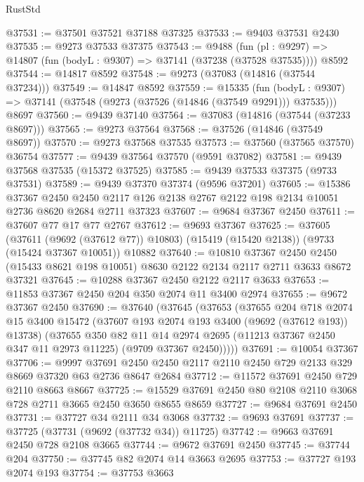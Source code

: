 \begin{lexlean}{RustStd}
\begin{coremodule}
@37531 := @37501 @37521 @37188 @37325
@37533 := @9403 @37531 @2430
@37535 := @9273 @37533 @37375
@37543 := @9488
    (fun (pl : @9297) => @14807 (fun (bodyL : @9307) => @37141 (@37238 (@37528 @37535))))
    @8592
@37544 := @14817 @8592
@37548 := @9273 (@37083 (@14816 (@37544 @37234)))
@37549 := @14847 @8592
@37559 := @15335
    (fun (bodyL : @9307) => @37141 (@37548 (@9273 (@37526 (@14846 (@37549 @9291))) @37535)))
    @8697
@37560 := @9439 @37140
@37564 := @37083 (@14816 (@37544 (@37233 @8697)))
@37565 := @9273 @37564
@37568 := @37526 (@14846 (@37549 @8697))
@37570 := @9273 @37568 @37535
@37573 := @37560 (@37565 @37570) @36754
@37577 := @9439 @37564 @37570 (@9591 @37082)
@37581 := @9439 @37568 @37535 (@15372 @37525)
@37585 := @9439 @37533 @37375 (@9733 @37531)
@37589 := @9439 @37370 @37374 (@9596 @37201)
@37605 := @15386
    @37367
    @2450
    @2450
    @2117
    @126
    @2138
    @2767
    @2122
    @198
    @2134
    @10051
    @2736
    @8620
    @2684
    @2711
    @37323
@37607 := @9684 @37367 @2450
@37611 := @37607 @77 @17 @77 @2767
@37612 := @9693 @37367
@37625 := @37605
    (@37611 (@9692 (@37612 @77)) @10803)
    (@15419 (@15420 @2138))
    (@9733 (@15424 @37367 @10051))
    @10882
@37640 := @10810
    @37367
    @2450
    @2450
    (@15433 @8621 @198 @10051)
    @8630
    @2122
    @2134
    @2117
    @2711
    @3633
    @8672
    @37321
@37645 := @10288 @37367 @2450 @2122 @2117 @3633
@37653 := @11853 @37367 @2450 @204 @350 @2074 @11 @3400 @2974
@37655 := @9672 @37367 @2450
@37690 := @37640
    (@37645
      (@37653
        (@37655
          @204
          @718
          @2074
          @15
          @3400
          @15472
          (@37607 @193 @2074 @193 @3400 (@9692 (@37612 @193)) @13738)
          (@37655
            @350
            @82
            @11
            @14
            @2974
            @2695
            (@11213 @37367 @2450 @347 @11 @2973 @11225)
            (@9709 @37367 @2450)))))
@37691 := @10054 @37367
@37706 := @9997
    @37691
    @2450
    @2450
    @2117
    @2110
    @2450
    @729
    @2133
    @329
    @8669
    @37320
    @63
    @2736
    @8647
    @2684
@37712 := @11572 @37691 @2450 @729 @2110 @8663 @8667
@37725 := @15529 @37691 @2450 @80 @2108 @2110 @3068 @728 @2711 @3665 @2450 @3650 @8655 @8659
@37727 := @9684 @37691 @2450
@37731 := @37727 @34 @2111 @34 @3068
@37732 := @9693 @37691
@37737 := @37725 (@37731 (@9692 (@37732 @34)) @11725)
@37742 := @9663 @37691 @2450 @728 @2108 @3665
@37744 := @9672 @37691 @2450
@37745 := @37744 @204
@37750 := @37745 @82 @2074 @14 @3663 @2695
@37753 := @37727 @193 @2074 @193
@37754 := @37753 @3663

\end{coremodule}
\end{lexlean}
